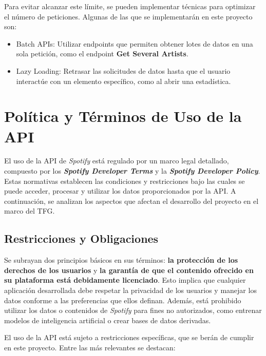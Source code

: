 \newpage

Para evitar alcanzar este límite, se pueden implementar técnicas para optimizar el número de peticiones. Algunas de las que se implementarán en este proyecto son:

\begin{itemize}
    \item Batch APIs: Utilizar endpoints que permiten obtener lotes de datos en una sola petición, como el endpoint \textbf{Get Several Artists}.
    \item Lazy Loading: Retrasar las solicitudes de datos hasta que el usuario interactúe con un elemento específico, como al abrir una estadística.
\end{itemize}

\section{Política y Términos de Uso de la API}

El uso de la API de \textit{Spotify} está regulado por un marco legal detallado, compuesto por los \textit{\textbf{Spotify Developer Terms}} y la \textit{\textbf{Spotify Developer Policy}}. Estas normativas establecen las condiciones y restricciones bajo las cuales se puede acceder, procesar y utilizar los datos proporcionados por la API. A continuación, se analizan los aspectos que afectan el desarrollo del proyecto en el marco del TFG.

\subsection{Restricciones y Obligaciones}

Se subrayan dos principios básicos en sus términos: \textbf{la protección de los derechos de los usuarios} y \textbf{la garantía de que el contenido ofrecido en su plataforma está debidamente licenciado}. Esto implica que cualquier aplicación desarrollada debe respetar la privacidad de los usuarios y manejar los datos conforme a las preferencias que ellos definan. Además, está prohibido utilizar los datos o contenidos de \textit{Spotify} para fines no autorizados, como entrenar modelos de inteligencia artificial o crear bases de datos derivadas.

El uso de la API está sujeto a restricciones específicas, que se berán de cumplir en este proyecto. Entre las más relevantes se destacan:

